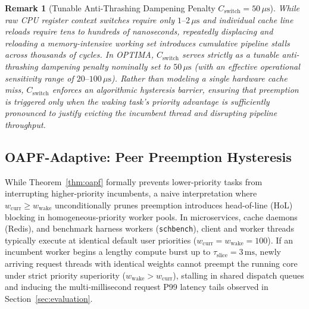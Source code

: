 \documentclass[letterpaper,twocolumn,10pt]{article}
\newtheorem{remark}{Remark}
\begin{document}
\begin{remark}[Tunable Anti-Thrashing Dampening Penalty $C_{\mathrm{switch}} = 50\,\mu\text{s}$]
While raw CPU register context switches require only $1\text{--}2\,\mu\text{s}$ and individual cache line reloads require tens to hundreds of nanoseconds, repeatedly displacing and reloading a memory-intensive working set introduces cumulative pipeline stalls across thousands of cycles. In OPTIMA, $C_{\mathrm{switch}}$ serves strictly as a \emph{tunable anti-thrashing dampening penalty} nominally set to $50\,\mu\text{s}$ (with an effective operational sensitivity range of $20\text{--}100\,\mu\text{s}$). Rather than modeling a single hardware cache miss, $C_{\mathrm{switch}}$ enforces an algorithmic hysteresis barrier, ensuring that preemption is triggered only when the waking task's priority advantage is sufficiently pronounced to justify evicting the incumbent thread and disrupting pipeline throughput.
\end{remark}

\subsection{OAPF-Adaptive: Peer Preemption Hysteresis}
\label{sec:oapf_adaptive}
While Theorem~\ref{thm:oapf} formally prevents lower-priority tasks from interrupting higher-priority incumbents, a naive interpretation where $w_{\mathrm{curr}} \ge w_{\mathrm{wake}}$ unconditionally prunes preemption introduces head-of-line (HoL) blocking in homogeneous-priority worker pools. In microservices, cache daemons (Redis), and benchmark harness workers (\texttt{schbench}), client and worker threads typically execute at identical default user priorities ($w_{\mathrm{curr}} = w_{\mathrm{wake}} = 100$). If an incumbent worker begins a lengthy compute burst up to $\tau_{\mathrm{slice}} = 3\,\mathrm{ms}$, newly arriving request threads with identical weights cannot preempt the running core under strict priority superiority ($w_{\mathrm{wake}} > w_{\mathrm{curr}}$), stalling in shared dispatch queues and inducing the multi-millisecond request P99 latency tails observed in Section~\ref{sec:evaluation}.
\end{document}
